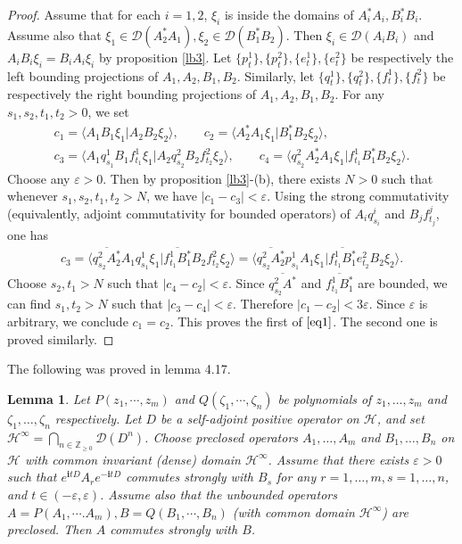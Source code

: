 \documentclass[12pt,a4paper]{article}
\theoremstyle{definition}
\theoremstyle{plain}
\newtheorem{lm}[df]{Lemma}
\newcommand{\mc}{\mathcal}
\newcommand{\ovl}{\overline}
\newcommand{\Dom}{\scr D}
\newcommand{\bk}[1]{\langle {#1}\rangle}
\newcommand{\scr}{\mathscr}
\newcommand{\im}{\mathbf{i}}
\numberwithin{equation}{subsection}
\begin{document}
\begin{subappendices}
\begin{proof}
	Assume that for each $i=1,2$, $\xi_i$ is inside the domains of $A_i^*A_i,B_i^*B_i$. Assume also that $\xi_1\in\Dom(A_2^*A_1),\xi_2\in\Dom(B_1^*B_2)$. Then $\xi_i\in\Dom(A_iB_i)$ and $A_iB_i\xi_i=B_iA_i\xi_i$ by proposition \ref{lb3}. Let $\{p^1_t\},\{p^2_t\},\{e^1_t\},\{e^2_t\}$ be respectively the left bounding projections of $A_1,A_2,B_1,B_2$. Similarly, let $\{q^1_t\},\{q^2_t\},\{f^1_t\},\{f^2_t\}$ be respectively the right bounding projections of $A_1,A_2,B_1,B_2$. For any $s_1,s_2,t_1,t_2>0$, we set
	\begin{gather*}
	c_1=\bk{A_1B_1\xi_1|A_2B_2\xi_2},\qquad c_2=\bk{A_2^*A_1\xi_1|B_1^*B_2\xi_2},\\
	c_3=\bk{A_1q^1_{s_1}B_1f^1_{t_1}\xi_1|A_2q^2_{s_2}B_2f^2_{t_2}\xi_2},\qquad c_4=\bk{q^2_{s_2}A_2^*A_1\xi_1|f^1_{t_1}B_1^*B_2\xi_2}.
	\end{gather*}
	Choose any $\varepsilon>0$. Then by proposition \ref{lb3}-(b), there exists $N>0$ such that whenever $s_1,s_2,t_1,t_2>N$, we have $|c_1-c_3|<\varepsilon$. Using the strong commutativity (equivalently, adjoint commutativity for bounded operators) of $A_iq^i_{s_i}$ and $B_jf^j_{t_j}$, one has
	\begin{align*}
	c_3=\bk{\ovl{q^2_{s_2}A_2^*}A_1q^1_{s_1}\xi_1|\ovl{f^1_{t_1}B_1^*}B_2f^2_{t_2}\xi_2}=\bk{\ovl{q^2_{s_2}A_2^*}p^1_{s_1}A_1\xi_1|\ovl{f^1_{t_1}B_1^*}e^2_{t_2}B_2\xi_2}.
	\end{align*}
	Choose $s_2,t_1>N$ such that $|c_4-c_2|<\varepsilon$. Since $\ovl{q^2_{s_2}A^*}$ and $\ovl{f^1_{t_1}B_1^*}$ are bounded, we can find $s_1,t_2>N$ such that $|c_3-c_4|<\varepsilon$. Therefore $|c_1-c_2|<3\varepsilon$. Since $\varepsilon$ is arbitrary, we conclude $c_1=c_2$. This proves the first of $\eqref{eq1}$. The second one is proved similarly.
\end{proof}

The following was proved in \cite{Gui21a} lemma 4.17.

\begin{lm}\label{lb59}
	Let $P(z_1,\cdots,z_m)$ and $Q(\zeta_1,\cdots,\zeta_n)$ be polynomials of $z_1,\dots,z_m$ and $\zeta_1,\dots,\zeta_n$ respectively. Let $D$ be a self-adjoint positive operator on $\mc H$, and set $\mc H^\infty=\bigcap_{n\in\mathbb Z_{\geq0}}\Dom(D^n)$. Choose  preclosed operators $A_1,\dots,A_m$ and $B_1,\dots,B_n$   on 
	$\mc H$ with common invariant (dense) domain $\mc H^\infty$. Assume that there exists $\varepsilon>0$ such that   $e^{\im tD}A_re^{-\im tD}$ commutes strongly with $B_s$ for any $r=1,\dots,m,s=1,\dots,n$, and  $t\in(-\varepsilon,\varepsilon)$.  Assume also that the unbounded operators $A=P(A_1,\cdots.A_m),B=Q(B_1,\cdots,B_n)$ (with common domain $\mc H^\infty$) are preclosed. Then $A$ commutes strongly with $B$.
\end{lm}






\end{subappendices}
\end{document}

